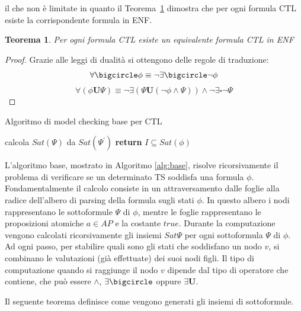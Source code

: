 \documentclass[a4paper, 10pt]{article}
\newtheorem{theor}{Teorema}[section]
\numberwithin{equation}{theor}
\begin{document}
il che non è limitate in quanto il Teorema~\ref{theorem:enf} dimostra che per ogni formula \ac{CTL} esiste la corrispondente formula in \ac{ENF}.
\begin{theor}
\label{theorem:enf}
Per ogni formula \ac{CTL} esiste un equivalente formula \ac{CTL} in \ac{ENF}
\end{theor}
\begin{proof}
Grazie alle leggi di dualità si ottengono delle regole di traduzione:
$$\forall\bigcircle \phi \equiv \neg \exists \bigcircle \neg \phi$$
$$\forall(\phi \boldsymbol{U} \Psi) \equiv \neg \exists( \Psi \boldsymbol{U} (\neg \phi \wedge \Psi)  )\wedge \neg\exists\square\neg\Psi$$
\end{proof}
\begin{algorithm}
\caption{Algoritmo di model checking base per \ac{CTL}}
\label{alg:base}
\begin{algorithmic}[1]
\State calcola $Sat(\Psi)$ da $Sat(\Psi^{'})$
\EndFor
\EndFor
\State \textbf{return} $I  \subseteq Sat(\phi)$
\EndProcedure
\end{algorithmic}
\end{algorithm}
L'algoritmo base, mostrato in Algoritmo \ref{alg:base}, risolve ricorsivamente il problema di verificare se un determinato \ac{TS} soddisfa una formula $\phi$.
Fondamentalmente il calcolo consiste in un attraversamento dalle foglie alla radice dell'albero di parsing della formula sugli stati $\phi$. In questo albero i nodi rappresentano le sottoformule $\Psi$ di $\phi$, mentre le foglie rappresentano le proposizioni atomiche $a \in AP$ e la costante $true$.
Durante la computazione vengono calcolati ricorsivamente gli insiemi $Sat{\Psi}$ per ogni sottoformula $\Psi$ di $\phi$. Ad ogni passo, per stabilire quali sono gli stati che soddisfano un nodo $v$, si combinano le valutazioni (già effettuate) dei suoi nodi figli. Il tipo di computazione quando si raggiunge il nodo $v$ dipende dal tipo di operatore che contiene, che può essere $\wedge$, $\exists\bigcircle$ oppure $\exists\boldsymbol{U}$.\par
Il seguente teorema definisce come vengono generati gli insiemi di sottoformule.
\end{document}
